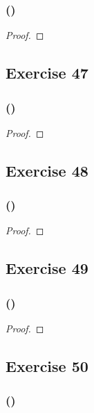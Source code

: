 \documentclass[14pt]{extarticle}
\begin{document}
\subsubsection{()}

\begin{proof}

\end{proof}

\subsection{Exercise 47}

\subsubsection{()}

\begin{proof}

\end{proof}

\subsection{Exercise 48}

\subsubsection{()}

\begin{proof}

\end{proof}

\subsection{Exercise 49}

\subsubsection{()}

\begin{proof}

\end{proof}

\subsection{Exercise 50}

\subsubsection{()}
\end{document}
